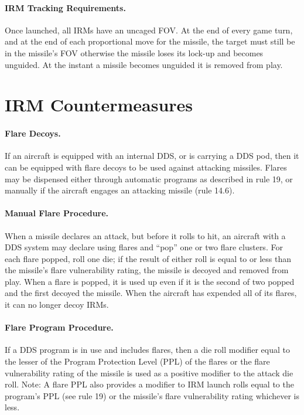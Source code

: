 
\paragraph{IRM Tracking Requirements.} Once launched, all IRMs have an uncaged FOV. At the end of every game turn, and at the end of each proportional move for the missile, the target must still be in the missile's FOV otherwise the missile loses its lock-up and becomes unguided. At the instant a missile becomes unguided it is removed from play.

\section{IRM Countermeasures}

\paragraph{Flare Decoys.} If an aircraft is equipped with an internal DDS, or is carrying a DDS pod, then it can be equipped with flare decoys to be used against attacking missiles. Flares may be dispensed either through automatic programs as described in rule 19, or manually if the aircraft engages an attacking missile (rule 14.6).

\paragraph{Manual Flare Procedure.} When a missile declares an attack, but before it rolls to hit, an aircraft with a DDS system may declare using flares and “pop” one or two flare clusters. For each flare popped, roll one die; if the result of either roll is equal to or less than the missile's flare vulnerability rating, the missile is decoyed and removed from play. When a flare is popped, it is used up even if it is the second of two popped and the first decoyed the missile. When the aircraft has expended all of its flares, it can no longer decoy IRMs.

\paragraph{Flare Program Procedure.} If a DDS program is in use and includes flares, then a die roll modifier equal to the lesser of the Program Protection Level (PPL) of the flares or the flare vulnerability rating of the missile is used as a positive modifier to the attack die roll. Note: A flare PPL also provides a modifier to IRM launch rolls equal to the program's PPL (see rule 19) or the missile's flare vulnerability rating whichever is less.

